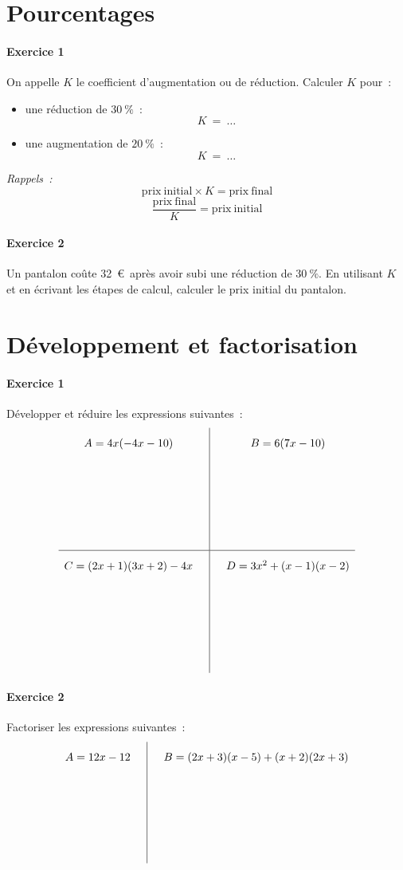 \documentclass[a4paper]{article}
\begin{document}
  \section*{Pourcentages}
  \paragraph{Exercice 1}
  On appelle $K$ le coefficient d'augmentation ou de réduction. Calculer $K$ pour~:
  \begin{itemize}
    \item une réduction de $30~\%$~:
      \[
        K \ =\ \dots
      \]
    \item une augmentation de $20~\%$~:
      \[
        K \ =\ \dots
      \]
  \end{itemize}
  \emph{Rappels~:}
  \[
    \mathrm{prix\ initial} \times K = \mathrm{prix\ final}
  \]
  \[
    \frac{\mathrm{prix\ final}}{K} = \mathrm{prix\ initial}
  \]

  \paragraph{Exercice 2}
  Un pantalon coûte 32~\euro\ après avoir subi une réduction de $30~\%$. En utilisant $K$ et en écrivant les étapes de calcul, calculer le prix initial du pantalon.
  \vspace{3cm}

  \section*{Développement et factorisation}
  \paragraph{Exercice 1}
  Développer et réduire les expressions suivantes~:
  \[
    \def\arraystretch{2}
    \begin{array}{c|c}
      A = 4x (-4x - 10) \quad&\quad B = 6(7x - 10)\\[3cm]
      \hline
      C = (2x + 1)(3x + 2) - 4x \quad&\quad D = 3x^2 + (x - 1)(x - 2)\\[3cm]
    \end{array}
  \]

  \paragraph{Exercice 2}
  Factoriser les expressions suivantes~:
  \[
    \def\arraystretch{2}
    \begin{array}{c|c}
      A = 12x - 12 \quad&\quad B = (2x+3)(x-5) + (x+2)(2x+3)\\[3cm]
    \end{array}
  \]
\end{document}
